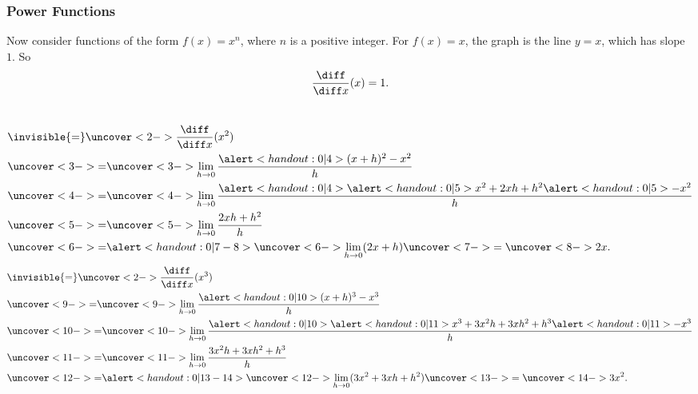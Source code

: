 \begin{frame}
\frametitle{Power Functions}
Now consider functions of the form $f(x) = x^n$, where $n$ is a positive integer.  For $f(x) = x$, the graph is the line $y = x$, which has slope $1$.  So 
\[
\frac{\diff}{\diff x} (x) = 1.
\]

%
\begin{columns}[t]
\abovedisplayskip=0pt
\belowdisplayskip=0pt
\begin{align*}
& \invisible{ = } \uncover<2->{\frac{\diff}{\diff x} (x^2)}\\
& \uncover<3->{ = }  %
\uncover<3->{\lim_{h\rightarrow 0}\frac{\alert<handout:0| 4>{(x+h)^2} - x^2}{h}}\\
& \uncover<4->{ = }  %
\uncover<4->{\lim_{h\rightarrow 0}\frac{\alert<handout:0| 4>{\alert<handout:0| 5>{x^2} + 2xh + h^2}  \alert<handout:0| 5>{- x^2}}{h}}\\
& \uncover<5->{ = }  %
\uncover<5->{\lim_{h\rightarrow 0}\frac{2xh + h^2}{h}}\\
& \uncover<6->{ = }  %
\alert<handout:0| 7-8>{\uncover<6->{\lim_{h\rightarrow 0}(2x + h)}\uncover<7->{ = \uncover<8->{2x.}}}
\end{align*}
\abovedisplayskip=0pt
\belowdisplayskip=0pt
\begin{align*}
& \invisible{ = } \uncover<2->{\frac{\diff}{\diff x} (x^3)}\\
& \uncover<9->{ = }  %
\uncover<9->{\lim_{h\rightarrow 0}\frac{\alert<handout:0| 10>{(x+h)^3} - x^3}{h}}\\
& \uncover<10->{ = }  %
\uncover<10->{\lim_{h\rightarrow 0}\frac{\alert<handout:0| 10>{\alert<handout:0| 11>{x^3} + 3x^2h + 3xh^2 + h^3}  \alert<handout:0| 11>{- x^3}}{h}}\\
& \uncover<11->{ = }  %
\uncover<11->{\lim_{h\rightarrow 0}\frac{3x^2h + 3xh^2 + h^3}{h}}\\
& \uncover<12->{ = }  %
\alert<handout:0| 13-14>{\uncover<12->{\lim_{h\rightarrow 0}(3x^2 + 3xh + h^2)}\uncover<13->{ = \uncover<14->{3x^2.}}}
\end{align*}
\end{columns}
\end{frame}
